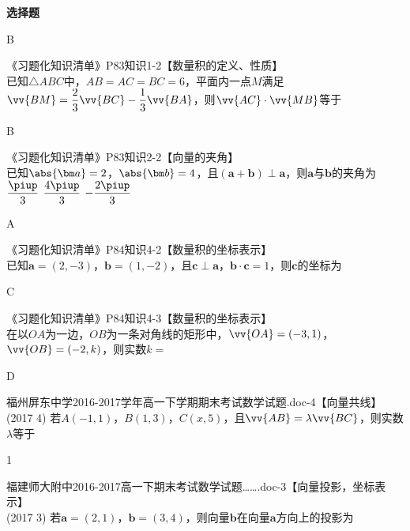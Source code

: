 \begin{exercise}{\bf 选择题}
      \begin{answer}
        B
      \end{answer}
    \item 《习题化知识清单》P83知识1-2【数量积的定义、性质】\\
      已知$\triangle{ABC}$中，$AB=AC=BC=6$，平面内一点$M$满足$\vv{BM}=\dfrac{2}3\vv{BC}-\dfrac{1}3\vv{BA}$，则$\vv{AC}\cdot\vv{MB}$等于\xz
      \begin{answer}
        B
      \end{answer}
    \item 《习题化知识清单》P83知识2-2【向量的夹角】\\
      已知$\abs{\bm a}=2$，$\abs{\bm b}=4$，且$(\bm a+\bm b)\perp \bm a$，则$\bm a$与$\bm b$的夹角为\xz
       {$\dfrac{\piup}3$}
       {$\dfrac{4\piup}3$}
       {$-\dfrac{2\piup}3$}
      \begin{answer}
        A
      \end{answer}
    \item 《习题化知识清单》P84知识4-2【数量积的坐标表示】\\
      已知$\bm a=(2,-3)$，$\bm b=(1,-2)$，且$\bm c\perp \bm a$，$\bm b\cdot\bm c=1$，则$\bm c$的坐标为\xz
      \begin{answer}
        C
      \end{answer}
    \item 《习题化知识清单》P84知识4-3【数量积的坐标表示】\\
      在以$OA$为一边，$OB$为一条对角线的矩形中，$\vv{OA}=(-3,1)$，$\vv{OB}=(-2,k)$，则实数$k=$\xz
      \begin{answer}
        D
      \end{answer}
    \item 福州屏东中学2016-2017学年高一下学期期末考试数学试题.doc-4【向量共线】\\
      (2017  4)
      若$A(-1,1)$，$B(1,3)$，$C(x,5)$，且$\vv{AB}=\lambda\vv{BC}$，则实数$\lambda$等于\xz
      \begin{answer}
        1
      \end{answer}
    \item 福建师大附中2016-2017高一下期末考试数学试题…….doc-3【向量投影，坐标表示】\\
      (2017  3)
      若$\bm a=(2,1)$，$\bm b=(3,4)$，则向量$\bm b$在向量$\bm a$方向上的投影为\xz

\end{exercise}

